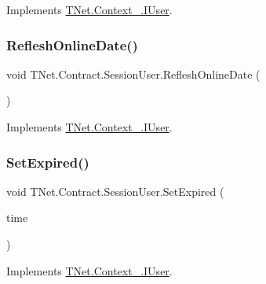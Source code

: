 Implements \mbox{\hyperlink{interface_t_net_1_1_context___1_1_i_user_a92f3fbefd7171a20797ea2115c1d3381}{T\+Net.\+Context\+\_\+.\+I\+User}}.

\mbox{\label{class_t_net_1_1_contract_1_1_session_user_a972f612fe19d4de10d41824553eb6859}} 
\subsubsection{\texorpdfstring{Reflesh\+Online\+Date()}{RefleshOnlineDate()}}
{\footnotesize\ttfamily void T\+Net.\+Contract.\+Session\+User.\+Reflesh\+Online\+Date (\begin{DoxyParamCaption}{ }\end{DoxyParamCaption})}







Implements \mbox{\hyperlink{interface_t_net_1_1_context___1_1_i_user_a7a87e43918c1415f2782cf201fb8228e}{T\+Net.\+Context\+\_\+.\+I\+User}}.

\mbox{\label{class_t_net_1_1_contract_1_1_session_user_ac875074672d0a372faabe3f9e4b5805b}} 
\subsubsection{\texorpdfstring{Set\+Expired()}{SetExpired()}}
{\footnotesize\ttfamily void T\+Net.\+Contract.\+Session\+User.\+Set\+Expired (\begin{DoxyParamCaption}\item[{Date\+Time}]{time }\end{DoxyParamCaption})}







Implements \mbox{\hyperlink{interface_t_net_1_1_context___1_1_i_user_a17456df46fa86d2e5626d66493ba8d67}{T\+Net.\+Context\+\_\+.\+I\+User}}.



